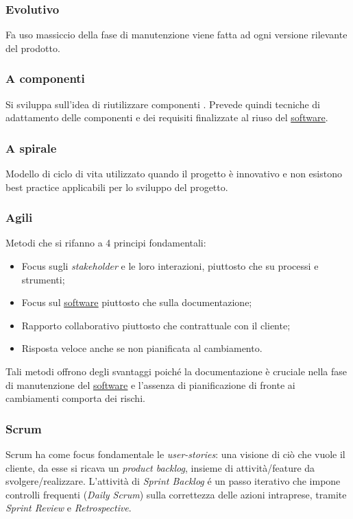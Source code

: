 		
		\subsubsection{Evolutivo}
			Fa uso massiccio della fase di manutenzione viene fatta ad ogni versione rilevante del prodotto.

		
		\subsubsection{A componenti}
			Si sviluppa sull'idea di riutilizzare componenti . Prevede quindi tecniche di adattamento delle componenti e dei requisiti finalizzate al riuso del \underline{\hyperref[sec:prodottosoftware]{software}}.

		
		\subsubsection{A spirale}
				Modello di ciclo di vita utilizzato quando il progetto è innovativo e non esistono best practice applicabili per lo sviluppo del progetto.

		
		\subsubsection{Agili}
		Metodi che si rifanno a 4 principi fondamentali:
			\begin{itemize}
			\item Focus sugli \emph{stakeholder} e le loro interazioni, piuttosto che su processi e strumenti;
			\item Focus sul \underline{\hyperref[sec:prodottosoftware]{software}} piuttosto che sulla documentazione;
			\item Rapporto collaborativo piuttosto che contrattuale con il cliente;
			\item Risposta veloce anche se non pianificata al cambiamento.
			\end{itemize}
		Tali metodi offrono degli svantaggi poiché la documentazione è cruciale nella fase di manutenzione del \underline{\hyperref[sec:prodottosoftware]{software}} e l'assenza di pianificazione di fronte ai cambiamenti comporta dei rischi.

			
			\subsubsection{Scrum}
				Scrum ha come focus fondamentale le  \emph{user-stories}: una visione di ciò che vuole il cliente, da esse si ricava un \emph{product backlog}, insieme di attività/feature da svolgere/realizzare. L'attività di \emph{Sprint Backlog} é un passo iterativo che impone controlli frequenti (\emph{Daily Scrum}) sulla correttezza delle azioni intraprese, tramite \emph{Sprint Review} e \emph{Retrospective}.
				
